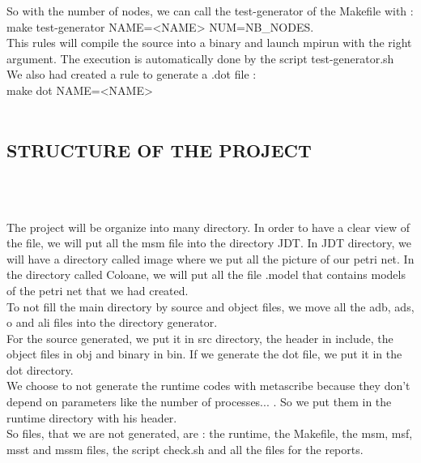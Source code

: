 \documentclass[a4paper,oneside,12pt]{article}
\begin{document}
   So with the number of nodes, we can call the test-generator of the Makefile with : \\

   make test-generator NAME=<NAME> NUM=NB\_NODES. \\

This rules will compile the source into a binary and launch mpirun with the right argument. The execution is automatically done by the script test-generator.sh\\

   We also had created a rule to generate a .dot file : \\
 
   make dot NAME=<NAME>\\\\

\subsection{STRUCTURE OF THE PROJECT}
\textbf{\\\\}

    The project will be organize into many directory. In order to have a clear view of the file, we will put all the msm file into the directory JDT. In JDT directory, we will have a directory called image where we put all the picture of our petri net. In the directory called Coloane, we will put all the file .model that contains models of the petri net that we had created.\\

   To not fill the main directory by source and object files, we move all the adb, ads, o and ali files into the directory generator.\\

   For the source generated, we put it in src directory, the header in include, the object files in obj and binary in bin. If we generate the dot file, we put it in the dot directory.\\

   We choose to not generate the runtime codes with metascribe because they don't depend on parameters like the number of processes... . So we put them in the runtime directory with his header.\\

   So files, that we are not generated, are : the runtime, the Makefile, the msm, msf, msst and mssm files, the script check.sh and all the files for the reports.\\
 
\end{document}
